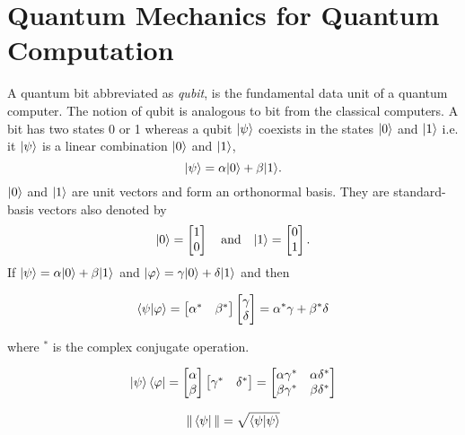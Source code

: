\section{Quantum Mechanics for Quantum Computation}
A quantum bit abbreviated as \emph{qubit}, is the fundamental data unit of a quantum computer. The notion of qubit is analogous to bit from the classical computers. A bit has two states 0 or 1 whereas a qubit $|\psi\rangle$ coexists in the states $|0\rangle$ and $|1\rangle$ i.e. it $|\psi\rangle$ is a linear combination $|0\rangle$ and $|1\rangle$,
\begin{equation}
|\psi\rangle = \alpha|0\rangle + \beta|1\rangle.
\end{equation}
$|0\rangle$ and $|1\rangle$ are unit vectors and form an orthonormal basis. They are standard-basis vectors also denoted by
\begin{equation*}
|0\rangle = \begin{bmatrix}1\\0\end{bmatrix} \quad \text{and} \quad |1\rangle = \begin{bmatrix}0\\1\end{bmatrix}.
\end{equation*}
If $|\psi\rangle = \alpha|0\rangle + \beta|1\rangle$ and $|\varphi\rangle = \gamma|0\rangle + \delta|1\rangle$ and then
\begin{definition} \[\braket{\psi|\varphi} = \begin{bmatrix}\alpha^* & \beta^*\end{bmatrix}\begin{bmatrix}\gamma\\\delta\end{bmatrix}=\alpha^*\gamma+\beta^*\delta\]
\end{definition}
where $^*$ is the complex conjugate operation.
\begin{definition} \[
\ket{\psi}\bra{\varphi} =
\begin{bmatrix}\alpha\\\beta\end{bmatrix}
\begin{bmatrix}\gamma^*&\delta^*\end{bmatrix}
=\begin{bmatrix}\alpha\gamma^*&\alpha\delta^*\\\beta\gamma^*&\beta\delta^*\end{bmatrix}\]
\end{definition}
\begin{definition} \[\|\bra{\psi}\| = \sqrt{\braket{\psi|\psi}}\]
\end{definition}

